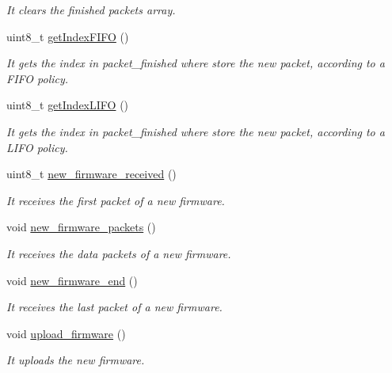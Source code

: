 \begin{DoxyCompactItemize}
\begin{DoxyCompactList}\small\item\em It clears the finished packets array. \end{DoxyCompactList}\item 
uint8\+\_\+t \hyperlink{class_wasp_x_bee_core_ad24e784a7e949946d311304d2ccb6b3b}{get\+Index\+F\+I\+FO} ()
\begin{DoxyCompactList}\small\item\em It gets the index in \textquotesingle{}packet\+\_\+finished\textquotesingle{} where store the new packet, according to a F\+I\+FO policy. \end{DoxyCompactList}\item 
uint8\+\_\+t \hyperlink{class_wasp_x_bee_core_a1ba6cfc9eee0847c04bcfa8c311a95ab}{get\+Index\+L\+I\+FO} ()
\begin{DoxyCompactList}\small\item\em It gets the index in \textquotesingle{}packet\+\_\+finished\textquotesingle{} where store the new packet, according to a L\+I\+FO policy. \end{DoxyCompactList}\item 
uint8\+\_\+t \hyperlink{class_wasp_x_bee_core_a32686d24d524a02e054946f884a6db44}{new\+\_\+firmware\+\_\+received} ()
\begin{DoxyCompactList}\small\item\em It receives the first packet of a new firmware. \end{DoxyCompactList}\item 
void \hyperlink{class_wasp_x_bee_core_af920fce7df72752b814de3fde121468b}{new\+\_\+firmware\+\_\+packets} ()
\begin{DoxyCompactList}\small\item\em It receives the data packets of a new firmware. \end{DoxyCompactList}\item 
void \hyperlink{class_wasp_x_bee_core_a32d4582ebc97202890794ca4d201d0b6}{new\+\_\+firmware\+\_\+end} ()
\begin{DoxyCompactList}\small\item\em It receives the last packet of a new firmware. \end{DoxyCompactList}\item 
void \hyperlink{class_wasp_x_bee_core_a13f361e12b28f3bee4b5572f35131c96}{upload\+\_\+firmware} ()
\begin{DoxyCompactList}\small\item\em It uploads the new firmware. \end{DoxyCompactList}\item 

\end{DoxyCompactItemize}
